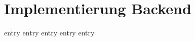 \chapter{Implementierung Backend}
\label{chap:implementierung_backend}

{entry}
{entry}
{entry}
{entry}
{entry}
